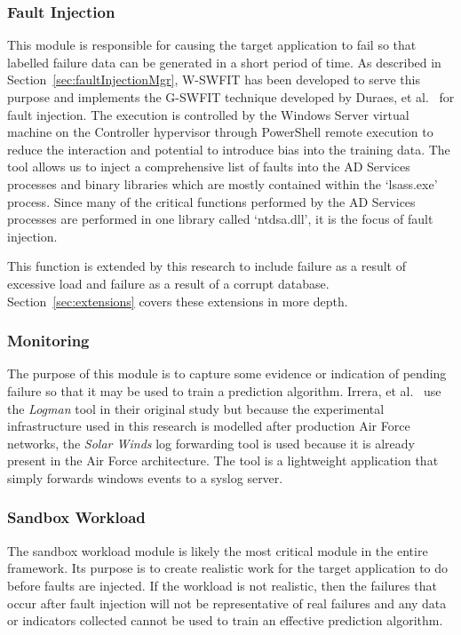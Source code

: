 \subsubsection{Fault Injection} \label{sec:faultInjectionTool} 
This module is responsible for causing the target application to fail so that
labelled failure data can be generated in a short period of time.  As described
in Section~\ref{sec:faultInjectionMgr}, W-SWFIT has been developed to serve
this purpose and implements the G-SWFIT technique developed by Duraes, et
al.~\cite{gswfit} for fault injection.  The execution is controlled by the
Windows Server virtual machine on the Controller hypervisor through PowerShell
remote execution to reduce the interaction and potential to introduce bias into
the training data.  The tool allows us to inject a comprehensive list of faults
into the AD Services processes and binary libraries which are mostly contained
within the `lsass.exe' process.  Since many of the critical functions performed
by the AD Services processes are performed in one library called `ntdsa.dll',
it is the focus of fault injection.

This function is extended by this research to include failure as a result of
excessive load and failure as a result of a corrupt database.
Section~\ref{sec:extensions} covers these extensions in more depth.

\subsubsection{Monitoring} \label{sec:sandboxMonitoringTool} 
The purpose of this module is to capture some evidence or indication of pending
failure so that it may be used to train a prediction algorithm.  Irrera, et
al.~\cite{irrera2015} use the \emph{Logman} tool in their original study but
because the experimental infrastructure used in this research is modelled after
production Air Force networks, the \emph{Solar Winds} log forwarding tool is
used because it is already present in the Air Force architecture.  The tool is
a lightweight application that simply forwards windows events to a syslog
server.

\subsubsection{Sandbox Workload}  \label{sec:sandboxWorkload} 
The sandbox workload module is likely the most critical module in the entire
framework.  Its purpose is to create realistic work for the target application
to do before faults are injected.  If the workload is not realistic, then the
failures that occur after fault injection will not be representative of real
failures and any data or indicators collected cannot be used to train an
effective prediction algorithm.

